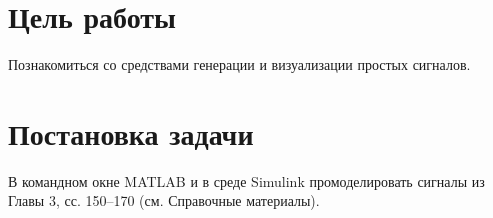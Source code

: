 \section{Цель работы}

Познакомиться со средствами генерации и визуализации простых сигналов.

\section{Постановка задачи}

В командном окне MATLAB и в среде Simulink промоделировать сигналы из Главы 3, сс. 150–170 (см. Справочные материалы).

